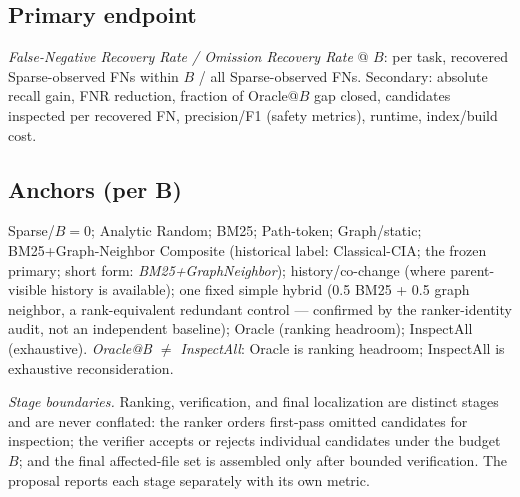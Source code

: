 \documentclass[11pt,a4paper]{article}
\begin{document}
\subsection{Primary endpoint}
\emph{False-Negative Recovery Rate / Omission Recovery Rate} @ $B$: per task,
recovered Sparse-observed FNs within $B$ / all Sparse-observed FNs. Secondary:
absolute recall gain, FNR reduction, fraction of Oracle@$B$ gap closed,
candidates inspected per recovered FN, precision/F1 (safety metrics), runtime,
index/build cost.

\subsection{Anchors (per B)}
Sparse/$B{=}0$; Analytic Random; BM25; Path-token; Graph/static;
BM25+Graph-Neighbor Composite (historical label: Classical-CIA; the frozen
primary; short form: \emph{BM25+GraphNeighbor}); history/co-change (where
parent-visible history is available); one
fixed simple hybrid (0.5 BM25 + 0.5 graph neighbor, a rank-equivalent
redundant control --- confirmed by the ranker-identity audit, not an
independent baseline); Oracle (ranking headroom); InspectAll (exhaustive).
\emph{Oracle@B $\neq$ InspectAll}: Oracle is ranking headroom;
InspectAll is exhaustive reconsideration.

\emph{Stage boundaries.} Ranking, verification, and final localization are
distinct stages and are never conflated: the ranker orders first-pass omitted
candidates for inspection; the verifier accepts or rejects individual
candidates under the budget $B$; and the final affected-file set is assembled
only after bounded verification. The proposal reports each stage separately
with its own metric.
\end{document}
